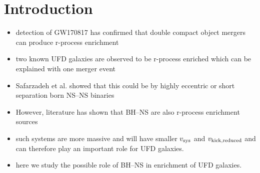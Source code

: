 \documentclass[a4paper,fleqn,usenatbib,useAMS,usedcolumn]{mnras}
\begin{document}
\section{Introduction}
\label{sec:introduction}
%
%
\begin{itemize}
	\item detection of GW170817 has confirmed that double compact object mergers can produce r-process enrichment
	\item two known UFD galaxies are observed to be r-process enriched  which can be explained with one merger event 
	\item Safarzadeh et al. showed that this could be by highly eccentric or short separation born NS--NS binaries
	\item However, literature has shown that BH--NS are also r-process enrichment sources 
	\item such systems are more massive and will have smaller $v_{\rm{sys}}$ and $v_{\rm{kick, reduced}}$ and can therefore play an important role for UFD galaxies.  
	\item here we study the possible role of  BH--NS in enrichment of UFD galaxies.
\end{itemize}
%
%
\end{document}
